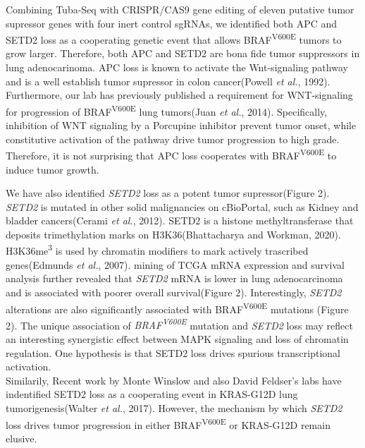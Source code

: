 Combining Tuba-Seq with CRISPR/CAS9 gene editing of eleven putative tumor supressor genes with four inert control sgRNAs, we identified both APC and SETD2 loss as a cooperating genetic event that allows BRAF\textsuperscript{V600E} tumors to grow larger.
Therefore, both APC and SETD2 are bona fide tumor suppressors in lung adenocarinoma.
APC loss is known to activate the Wnt-signaling pathway and is a well establish tumor supressor in colon cancer(Powell \emph{et al.}, 1992).
Furthermore, our lab has previously published a requirement for WNT-signaling for progression of BRAF\textsuperscript{V600E} lung tumors(Juan \emph{et al.}, 2014).
Specifically, inhibition of WNT signaling by a Porcupine inhibitor prevent tumor onset, while constitutive activation of the pathway drive tumor progression to high grade.
Therefore, it is not surprising that APC loss cooperates with BRAF\textsuperscript{V600E} to induce tumor growth.

We have also identified \emph{SETD2} loss as a potent tumor supressor(Figure 2).
\emph{SETD2} is mutated in other solid malignancies on cBioPortal, such as Kidney and bladder cancers(Cerami \emph{et al.}, 2012).
SETD2 is a histone methyltransferase that deposits trimethylation marks on H3K36(Bhattacharya and Workman, 2020).
H3K36me\textsuperscript{3} is used by chromatin modifiers to mark actively trascribed genes(Edmunds \emph{et al.}, 2007).
mining of TCGA mRNA expression and survival analysis further revealed that \emph{SETD2} mRNA is lower in lung adenocarcinoma and is associated with poorer overall survival(Figure 2).
Interestingly, \emph{SETD2} alterations are also significantly associated with BRAF\textsuperscript{V600E} mutations (Figure 2).
The unique association of \emph{BRAF\textsuperscript{V600E}} mutation and \emph{SETD2} loss may reflect an interesting synergistic effect between MAPK signaling and loss of chromatin regulation.
One hypothesis is that SETD2 loss drives spurious transcriptional activation.\\
Similarily, Recent work by Monte Winslow and also David Feldser's labs have indentified SETD2 loss as a cooperating event in KRAS-G12D lung tumorigenesis(Walter \emph{et al.}, 2017).
However, the mechanism by which \emph{SETD2} loss drives tumor progression in either BRAF\textsuperscript{V600E} or KRAS-G12D remain elusive.

